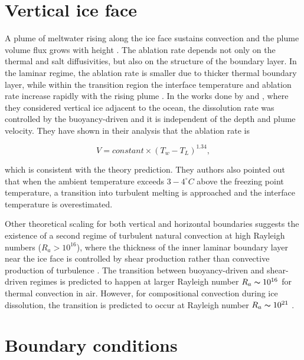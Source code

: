 \documentclass[11pt,a4paper]{article}
\begin{document}
	
	\section{Vertical ice face}
	
	A plume of meltwater rising along the ice face sustains convection and the plume volume flux grows with height \citep{jenkins2011convection}. The ablation rate depends not only on the thermal and salt diffusivities, but also on the structure of the boundary layer. In the laminar regime, the ablation rate is smaller due to thicker thermal boundary layer, while within the transition region the interface temperature and ablation rate increase rapidly with the rising plume \citep{gayen2016simulation}. In the works done by \cite{kerr2015dissolution} and \cite{gayen2016simulation}, where they considered vertical ice adjacent to the ocean, the dissolution rate was controlled by the buoyancy-driven and it is independent of the depth and plume velocity. They have shown in their analysis that the ablation rate is 
	
	\begin{equation}
	    V = constant\times (T_w-T_L)^{1.34},
	\end{equation}
	
	which is consistent with the theory prediction. They authors also pointed out that when the ambient temperature exceeds $3-4^{\circ} C$ above the freezing point temperature, a transition into turbulent melting is approached and the interface temperature is overestimated.
	
	Other theoretical scaling for both vertical and  horizontal boundaries suggests the existence of a second regime of turbulent natural convection at high Rayleigh numbers ($R_a> 10^{16}$), where the thickness of the inner laminar boundary layer near the ice face is controlled by shear production rather than convective production of turbulence \citep{grossmann2000scaling, wells2008geophysical,kerr2015dissolution,gayen2016simulation}. The transition between buoyancy-driven and shear-driven regimes is predicted to happen at larger Rayleigh number $R_a \thicksim 10^{16}$ for thermal convection in air. However, for compositional convection during ice dissolution, the transition is predicted to occur at Rayleigh number $R_a \thicksim 10^{21}$ \citep{kerr2015dissolution,gayen2016simulation}.

    \section{Boundary conditions}
    
\end{document}
